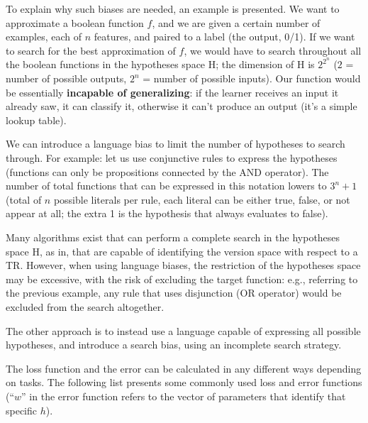 To explain why such biases are needed, an example is presented.
We want to approximate a boolean function $f$, and we are given a certain number of examples, each of $n$ features, and paired to a label (the output, 0/1). If we want to search for the best approximation of $f$, we would have to search throughout all the boolean functions in the hypotheses space H; the dimension of H is $2^{2^n}$ ($2$ = number of possible outputs, $2^n$ = number of possible inputs). Our function would be essentially \textbf{incapable of generalizing}: if the learner receives an input it already saw, it can classify it, otherwise it can't produce an output (it's a simple lookup table). 

\begin{center}
    \vspace{5mm}
    \vspace{5mm}
\end{center}

We can introduce a language bias to limit the number of hypotheses to search through.
For example: let us use conjunctive rules to express the hypotheses (functions can only be propositions connected by the AND operator). The number of total functions that can be expressed in this notation lowers to $3^n + 1$ (total of $n$ possible literals per rule, each literal can be either true, false, or not appear at all; the extra 1 is the hypothesis that always evaluates to false).

Many algorithms exist that can perform a complete search in the hypotheses space H, as in, that are capable of identifying the version space with respect to a TR. However, when using language biases, the restriction of the hypotheses space may be excessive, with the risk of excluding the target function: e.g., referring to the previous example, any rule that uses disjunction (OR operator) would be excluded from the search altogether.

The other approach is to instead use a language capable of expressing all possible hypotheses, and introduce a search bias, using an incomplete search strategy. 

The loss function and the error can be calculated in any different ways depending on tasks. The following list presents some commonly used loss and error functions (``$w$'' in the error function refers to the vector of parameters that identify that specific $h$).

